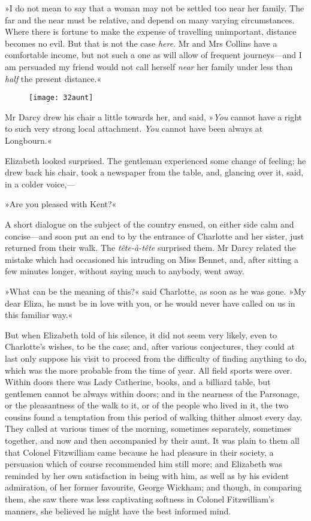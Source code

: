 »I do not mean to say that a woman may not be settled too near her family. The far and the near must be relative, and depend on many varying circumstances. Where there is fortune to make the expense of travelling unimportant, distance becomes no evil. But that is not the case \textit{here}. Mr and Mrs Collins have a comfortable income, but not such a one as will allow of frequent journeys—and I am persuaded my friend would not call herself \textit{near} her family under less than \textit{half} the present distance.«

\begin{figure}[tbph]
\centering
\texttt{[image: 32aunt]}
\end{figure}

Mr Darcy drew his chair a little towards her, and said, »\textit{You} cannot have a right to such very strong local attachment. \textit{You} cannot have been always at Longbourn.«

Elizabeth looked surprised. The gentleman experienced some change of feeling; he drew back his chair, took a newspaper from the table, and, glancing over it, said, in a colder voice,—

»Are you pleased with Kent?«

A short dialogue on the subject of the country ensued, on either side calm and concise—and soon put an end to by the entrance of Charlotte and her sister, just returned from their walk. The \textit{tête-à-tête} surprised them. Mr Darcy related the mistake which had occasioned his intruding on Miss Bennet, and, after sitting a few minutes longer, without saying much to anybody, went away.

»What can be the meaning of this?« said Charlotte, as soon as he was gone. »My dear Eliza, he must be in love with you, or he would never have called on us in this familiar way.«

But when Elizabeth told of his silence, it did not seem very likely, even to Charlotte's wishes, to be the case; and, after various conjectures, they could at last only suppose his visit to proceed from the difficulty of finding anything to do, which was the more probable from the time of year. All field sports were over. Within doors there was Lady Catherine, books, and a billiard table, but gentlemen cannot be always within doors; and in the nearness of the Parsonage, or the pleasantness of the walk to it, or of the people who lived in it, the two cousins found a temptation from this period of walking thither almost every day. They called at various times of the morning, sometimes separately, sometimes together, and now and then accompanied by their aunt. It was plain to them all that Colonel Fitzwilliam came because he had pleasure in their society, a persuasion which of course recommended him still more; and Elizabeth was reminded by her own satisfaction in being with him, as well as by his evident admiration, of her former favourite, George Wickham; and though, in comparing them, she saw there was less captivating softness in Colonel Fitzwilliam's manners, she believed he might have the best informed mind.





